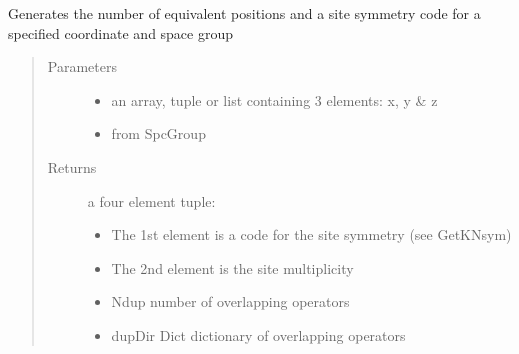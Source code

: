 \documentclass[letterpaper,10pt,english]{sphinxmanual}
\begin{document}

\begin{fulllineitems}
\label{\detokenize{index:TEMpcPlot.SytSym}}
Generates the number of equivalent positions and a site symmetry code for a specified coordinate and space group
\begin{quote}\begin{description}
\item[{Parameters}] \leavevmode\begin{itemize}
\item {} 
 \textendash{} an array, tuple or list containing 3 elements: x, y \& z

\item {} 
 \textendash{} from SpcGroup

\end{itemize}

\item[{Returns}] \leavevmode
a four element tuple:
\begin{itemize}
\item {} 
The 1st element is a code for the site symmetry (see GetKNsym)

\item {} 
The 2nd element is the site multiplicity

\item {} 
Ndup number of overlapping operators

\item {} 
dupDir Dict \sphinxhyphen{} dictionary of overlapping operators

\end{itemize}

\end{description}\end{quote}

\end{fulllineitems}

\end{document}
